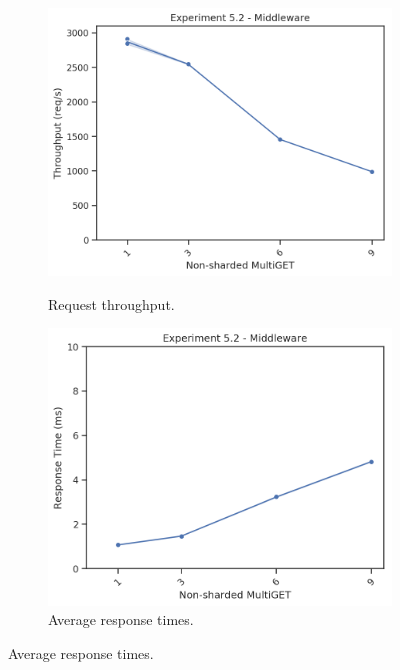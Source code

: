         \begin{figure}
            \vspace*{-.5\baselineskip}
                \centering
            \begin{subfigure}[t!]{0.48\textwidth}
                \centering
                \includegraphics[width=\textwidth]{../data_analysis/figures/5-2_mw_thoughput.png}
                \caption{Request throughput.\label{fig:noshard_mw_tp}}
                \includegraphics[width=\textwidth]{../data_analysis/figures/5-2_mw_response-time.png}
                \caption{Average response times.\label{fig:noshard_mw_rt}}
            \end{subfigure}

\end{figure}
